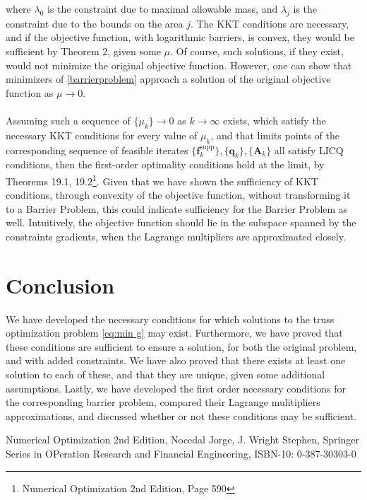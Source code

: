 \documentclass[10pt,a4paper]{article}
\begin{document}
where $\lambda_0$ is the constraint due to maximal allowable mass, and $\lambda_j$ is the constraint due to the bounds on the area $j$. The KKT conditions are necessary, and if the objective function, with logarithmic barriers, is convex, they would be sufficient by Theorem 2, given some $\mu$. Of course, such solutions, if they exist, would not minimize the original objective function. However, one can show that minimizers of \eqref{barrierproblem} approach a solution of the original objective function as $\mu \rightarrow 0$. 
\\\\
Assuming such a sequence of $\{\mu_k\} \rightarrow 0$ as $k\rightarrow \infty$ exists, which satisfy the necessary KKT conditions for every value of $\mu_k$, and that limits points of the corresponding sequence of feasible iterates $\{ \boldsymbol{f}^\text{supp}_k\},\{\boldsymbol{q}_k\},\{\boldsymbol{A}_k\}$ all satisfy LICQ conditions, then the first-order optimality conditions hold at the limit, by Theorems 19.1, 19.2\footnote{Numerical Optimization 2nd Edition, Page 590}. Given that we have shown the sufficiency of KKT conditions, through convexity of the objective function, without transforming it to a Barrier Problem, this could indicate sufficiency for the Barrier Problem as well. Intuitively, the objective function should lie in the subspace spanned by the constraints gradients, when the Lagrange multipliers are approximated closely.
\section{Conclusion}
We have developed the necessary conditions for which solutions to the truss optimization problem \eqref{eq:min g} may exist. Furthermore, we have proved that these conditions are sufficient to ensure a solution, for both the original problem, and with added constraints. We have also proved that there exists at least one solution to each of these, and that they are unique, given some additional assumptions. Lastly, we have developed the first order necessary conditions for the corresponding barrier problem, compared their Lagrange mulitipliers approximations, and discussed whether or not these conditions may be sufficient.
\begin{thebibliography}{2}
Numerical Optimization 2nd Edition, Nocedal Jorge, J. Wright Stephen, Springer Series in OPeration Research and Financial Engineering, ISBN-10: 0-387-30303-0
\end{thebibliography}
\end{document}
